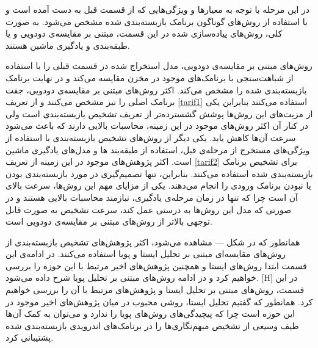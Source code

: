 در این مرحله با توجه به معیار‌ها و ویژگی‌هایی که از قسمت قبل به دست آمده است و با استفاده از روش‌های گوناگون برنامک بازبسته‌بندی شده مشخص می‌شود. به صورت کلی، روش‌های پیاده‌سازی شده در این قسمت، مبتنی بر مقایسه‌ی دودویی و یا طبقه‌بندی و یادگیری ماشین هستند.

 روش‌های مبتنی بر مقایسه‌ی دودویی، مدل استخراج شده در قسمت قبلی را با استفاده از شباهت‌سنجی با برنامک‌های موجود در مخزن مقایسه می‌کند و در نهایت برنامک بازبسته‌بندی شده را مشخص می‌کند. اکثر روش‌های مبتنی بر مقایسه‌ی دودویی، جفت برنامک اصلی را نیز مشخص می‌کنند و از تعریف
\ref{tarif1}
استفاده می‌کنند بنابراین یکی از مزیت‌های این روش‌ها پوشش گشسترده‌تر از تعریف تشخیص بازبسته‌بندی است ولی در کنار آن اکثر روش‌های موجود در این زمینه، محاسبات بالایی دارند که باعث می‌شود سرعت آن‌ها کاهش یابد.
 یکی دیگر از روش‌های تشخیص بازبسته‌بندی با استفاده از ویژگی‌های مستخرج از مرحله‌ی قبل، استفاده از طبقه‌بند ها و مدل‌های یادگیری ماشین است. اکثر پژوهش‌های موجود در این زمینه از تعریف
\ref{tarif2}
برای تشخیص برنامک بازبسته‌بندی شده استفاده می‌کنند. بنابراین، تنها تصمیم‌گیری در مورد بازبسته‌بندی بودن یا نبودن برنامک ورودی را انجام می‌دهند. یکی از مزایای مهم این رو‌ش‌ها، سرعت بالای آن است چرا که تنها در زمان مرحله‌ی یادگیری، نیازمند محاسبات بالایی هستند و در صورتی که مدل این روش‌ها به درستی عمل کند، سرعت تشخیص به صورت قابل توجهی بالاتر از روش‌های مبتنی بر مقایسه‌ی دودویی است.

همانطور که در شکل --- مشاهده می‌شود، اکثر پژوهش‌های تشخیص بازبسته‌بندی از روش‌های مقایسه‌ای مبتنی بر تحلیل ایستا و پویا استفاده می‌کنند. در ادامه‌ی این قسمت ابتدا روش‌های ایستا و همچنین پژوهش‌های اخیر مرتبط با این حوزه را بررسی خواهیم کرد و در ادامه روش‌های مبتنی بر تحلیل پویا شرح داده می‌شود.
[H]
\vspace{1em}
در این قسمت‌، روش‌های مبتنی بر تحلیل ایستا و پژوهش‌های مرتبط با آن را بررسی خواهیم کرد. همانطور که گفتیم تحلیل ایستا، روشی محبوب در میان پژوهش‌های اخیر موجود در این حوزه است چرا که پیچیدگی‌های روش‌های پویا را ندارد و می‌توان به کمک آن‌ها طیف وسیعی از تشخیص مبهم‌نگاری‌ها را در برنامک‌های اندرویدی بازبسته‌بندی شده پشتیبانی کرد.


